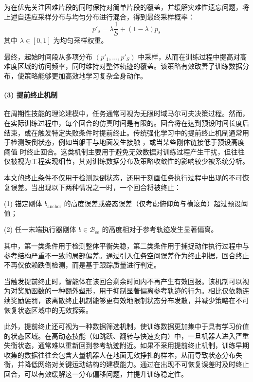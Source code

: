 为在优先关注困难片段的同时保持对简单片段的覆盖，并缓解灾难性遗忘问题，将上述自适应采样分布与均匀分布进行混合，得到最终采样概率：
\begin{equation}
	p'_s=\lambda\frac{1}{S}+(1-\lambda)p_s
\end{equation}
其中 $\lambda \in [0,1]$ 为均匀采样权重。

最终，起始时间段从多项分布 $(p'_1,\ldots,p'_S)$ 中采样，从而在训练过程中提高对高难度区域的访问频率，同时维持对整体轨迹的覆盖。该策略有效改善了训练数据分布，使策略能够更加高效地学习复杂全身动作。


\paragraph{(3) 提前终止机制}

在周期性技能的理论建模中，任务通常可视为无限时域马尔可夫决策过程。然而，在实际训练过程中，每个回合的仿真时间是有限的。回合将在达到预设时间长度后结束，或在触发特定失败条件时提前终止。传统强化学习中的提前终止机制通常用于检测跌倒状态，例如当躯干与地面发生接触 \cite{peng2016terrain}，或当某些刚体链接低于预设高度阈值 \cite{heess2016learning} 时终止回合。这类机制主要用于避免无效数据对训练过程产生干扰，但往往仅被视为工程实现细节，其对训练数据分布及策略收敛性的影响较少被系统分析。

本文的终止条件不仅用于检测跌倒状态，还用于刻画任务执行过程中出现的不可恢复误差。当出现以下两种情况之一时，一个回合将被终止：

(1) 锚定刚体 $b_{\text{anchor}}$ 的高度误差或姿态误差（仅考虑俯仰角与横滚角）超过预设阈值；

(2) 任一末端执行器刚体 $b \in \mathcal{B}_{\text{ee}}$ 的高度相对于参考轨迹发生显著偏离。

其中，第一类条件用于检测整体平衡失稳，第二类条件用于捕捉动作执行过程中与参考结构严重不一致的局部偏差。通过引入任务空间误差作为终止判据，回合终止不再仅依赖跌倒检测，而是基于跟踪质量进行判定。

当触发提前终止时，智能体在该回合剩余时间内不再产生有效回报。该机制可以视为对奖励函数的一种额外塑形，用于抑制显著偏离参考轨迹的行为。相比仅依赖连续奖励惩罚，该离散终止机制能够更有效地限制状态分布发散，并减少策略在不可恢复状态区域中的无效探索。

此外，提前终止还可视为一种数据筛选机制，使训练数据更加集中于具有学习价值的状态区域。在高动态技能（如跳跃、翻转与快速变向）中，一旦机器人进入严重失衡状态，通常难以重新回到参考轨迹附近。如果不采用提前终止机制，训练早期收集的数据往往会包含大量机器人在地面无效挣扎的样本，从而导致状态分布失衡，并降低网络对关键运动结构的建模能力。通过在出现不可恢复误差时及时终止回合，可以有效缓解这一分布偏移问题，并提升训练稳定性。

